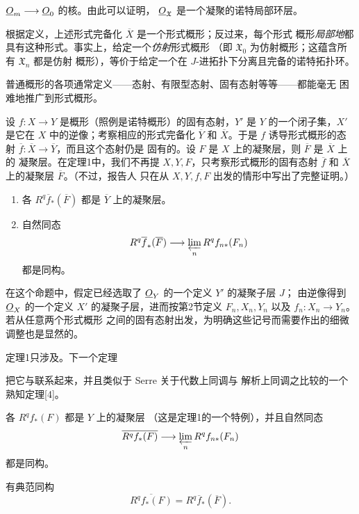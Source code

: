 $\underline{O}_m\longrightarrow\underline{O}_0$ 的核。由此可以证明，
$\underline{O}_{\mathfrak X}$ 是一个凝聚的诺特局部环层。

根据定义，上述形式完备化 $\overline X$ 是一个形式概形；反过来，每个形式
概形\emph{局部地}都具有这种形式。事实上，给定一个\emph{仿射}形式概形
（即 $\mathfrak X_0$ 为仿射概形；这蕴含所有 $\mathfrak X_n$ 都是仿射
概形），等价于给定一个在 $J$-进拓扑下分离且完备的诺特拓扑环。

普通概形的各项通常定义——态射、有限型态射、固有态射等等——都能毫无
困难地推广到形式概形。


设 $f:X\longrightarrow Y$ 是概形（照例是诺特概形）的固有态射，$Y'$ 是
$Y$ 的一个闭子集，$X'$ 是它在 $X$ 中的逆像；考察相应的形式完备化
$\overline Y$ 和 $\overline X$。于是 $f$ 诱导形式概形的态射
$\overline f:\overline X\longrightarrow\overline Y$，而且这个态射仍是
固有的。设 $F$ 是 $X$ 上的凝聚层，则 $\overline F$ 是 $\overline X$ 上的
凝聚层。在定理1中，我们不再提 $X,Y,F$，只考察形式概形的固有态射
$\overline f$ 和 $\overline X$ 上的凝聚层 $\overline F$。（不过，报告人
只在从 $X,Y,f,F$ 出发的情形中写出了完整证明。）

\begin{enumerate}
  \item[\textit{i.}] 各 $R^{q}\overline f_{*}(\overline F)$ 都是
    $\overline Y$ 上的凝聚层。
  \item[\textit{ii.}] 自然同态
    \[
      R^{q}\overline f_{*}(\overline F)
      \longrightarrow \varprojlim_n R^{q}f_{n*}(F_n)
    \]
    都是同构。
\end{enumerate}

在这个命题中，假定已经选取了 $\underline{O}_Y$ 的一个定义 $Y'$ 的凝聚子层 $J$；
由逆像得到 $\underline{O}_X$ 的一个定义 $X'$ 的凝聚子层，进而按第2节定义
$F_n,X_n,Y_n$ 以及 $f_n:X_n\longrightarrow Y_n$。若从任意两个形式概形
之间的固有态射出发，为明确这些记号而需要作出的细微调整也是显然的。

定理1只涉及。下一个定理

把它与联系起来，并且类似于 Serre 关于代数上同调与
解析上同调之比较的一个熟知定理[4]。

 各 $R^{q}f_{*}(F)$ 都是 $Y$ 上的凝聚层
（这是定理1的一个特例），并且自然同态
\[
  \overline{R^{q}f_{*}(F)}
  \longrightarrow \varprojlim_n R^{q}f_{n*}(F_n)
\]
都是同构。

 有典范同构
\[
  \overline{R^{q}f_{*}(F)}=R^{q}\overline f_{*}(\overline F).
\]

